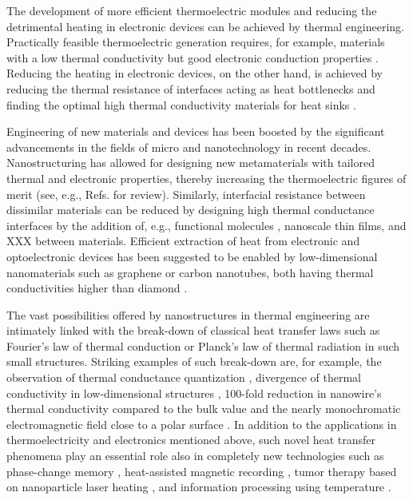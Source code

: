 
The development of more efficient thermoelectric modules and reducing the detrimental heating in electronic devices can be achieved by thermal engineering. Practically feasible thermoelectric generation requires, for example, materials with a low thermal conductivity but good electronic conduction properties \cite{chen}. Reducing the heating in electronic devices, on the other hand, is achieved by reducing the thermal resistance of interfaces acting as heat bottlenecks and finding the optimal high thermal conductivity materials for heat sinks \cite{pop10}. 

Engineering of new materials and devices has been boosted by the significant advancements in the fields of micro and nanotechnology in recent decades. Nanostructuring has allowed for designing new metamaterials with tailored thermal and electronic properties, thereby increasing the thermoelectric figures of merit (see, e.g., Refs. \cite{vineis10,kanatzidis10,shakouri11} for review). Similarly, interfacial resistance between dissimilar materials can be reduced by designing high thermal conductance interfaces by the addition of, e.g., functional molecules \cite{hopkins11,kaur14}, nanoscale thin films, and XXX between materials. Efficient extraction of heat from electronic and optoelectronic devices has been suggested \cite{ghosh08,yan12} to be enabled by low-dimensional nanomaterials such as graphene or carbon nanotubes, both having thermal conductivities higher than diamond \cite{balandin11}. 

The vast possibilities offered by nanostructures in thermal engineering are intimately linked with the break-down of classical heat transfer laws such as Fourier's law of thermal conduction \cite{fourier} or Planck's law of thermal radiation \cite{planck00a} in such small structures. Striking examples of such break-down are, for example, the observation of thermal conductance quantization \cite{rego98,schwab00}, divergence of thermal conductivity in low-dimensional structures \cite{lepri97,lepri03,dhar08,xu14}, 100-fold reduction in nanowire's thermal conductivity compared to the bulk value \cite{hochbaum08} and the nearly monochromatic electromagnetic field close to a polar surface \cite{carminati99,shchegrov00}. In addition to the applications in thermoelectricity and electronics mentioned above, such novel heat transfer phenomena play an essential role also in completely new technologies such as phase-change memory \cite{lankhorst05}, heat-assisted magnetic recording \cite{pan09}, tumor therapy based on nanoparticle laser heating \cite{avedisian09}, and information processing using temperature \cite{li12_rmp}.  %

